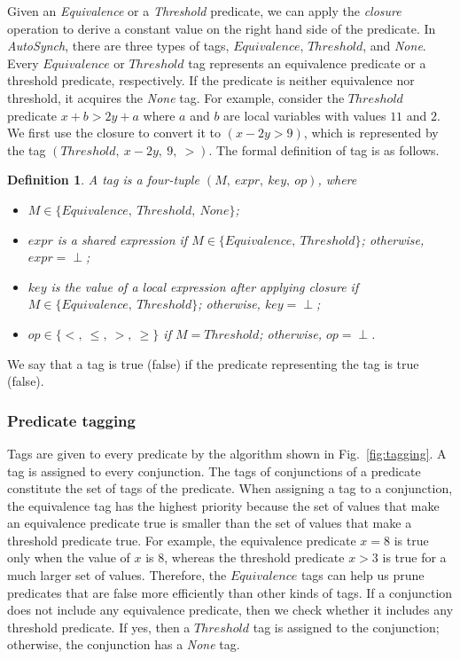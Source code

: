 \documentclass{sigplanconf}
\newtheorem{definition}{Definition}
\begin{document}
Given an {\em Equivalence} or a {\em Threshold} predicate, we can apply the {\em closure} operation 
to derive a constant value on the right hand side of the predicate. 
%
In {\em AutoSynch}, there are three types of tags, $Equivalence$, $Threshold$, and 
{\em None}. Every $Equivalence$ or $Threshold$ tag represents an equivalence predicate 
or a threshold predicate, respectively. 
If the predicate is neither equivalence nor threshold, it acquires the {\em None}
tag. For example, consider the $Threshold$ predicate $x + b > 2y + a$ where $a$ 
and $b$ are local variables with values $11$ and $2$.
We first use the closure to convert it to $(x - 2y > 9)$, which is
represented by the tag $(Threshold,\ x - 2y,\ 9,\ >)$. The formal definition of
tag is as follows. 
\begin{definition}
   A tag is a four-tuple $(M,\ expr,\ key,\ op)$, where  
   \begin{itemize}
      \item $M \in \{Equivalence,\ Threshold,\ None\}$;
      \item $expr$ is a shared expression if 
          $M \in \{Equivalence,\ Threshold\}$; otherwise, $expr= \perp$;
      \item $key$ is the value of a local expression after applying
          closure if $M \in \{Equivalence,\ Threshold\}$; otherwise, 
          $key= \perp$;
      \item $op \in \{<,\ \le,\ >,\ \ge\}$ if $M = Threshold$; otherwise, 
         $op = \perp$.
   \end{itemize}
\end{definition}
We say that a tag is true (false) if the predicate representing the tag is 
true (false).
 
\subsubsection{Predicate tagging}
Tags are given to every predicate by the algorithm shown in
Fig.~\ref{fig:tagging}. 
A tag is assigned to every conjunction. The tags of 
conjunctions of a predicate constitute the set of tags of the predicate. 
When assigning a tag to a conjunction, the equivalence tag has the highest 
priority because the set of values that make an equivalence predicate
true is smaller than the set of values that make a threshold predicate true. 
For example, 
the equivalence predicate $x = 8$ is true only when 
the value of $x$ is $8$, whereas the threshold predicate $x > 3$ is true for a much larger set of values.
Therefore, the $Equivalence$ tags can help us prune
predicates that are false more efficiently than other kinds of
tags. 
If a conjunction does not 
include any equivalence predicate, then we check whether it 
includes any threshold predicate. If yes, then a $Threshold$ tag is assigned 
to the conjunction; otherwise, the conjunction has a {\em None} tag. 
\end{document}
